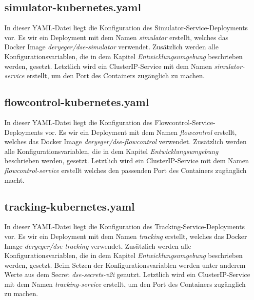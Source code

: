 \subsection{simulator-kubernetes.yaml}

In dieser YAML-Datei liegt die Konfiguration des Simulator-Service-Deploy\-ments vor.
Es wir ein Deployment mit dem Namen \textit{simulator} erstellt, welches das Docker Image \textit{deryeger/dse-simulator} verwendet.
Zusätzlich werden alle Konfigurationsvariablen, die in dem Kapitel \textit{Entwicklungsumgebung} beschrieben werden, gesetzt. 
Letztlich wird ein ClusterIP-Service mit dem Namen \textit{simulator-service} erstellt, um den Port des Containers zugänglich zu machen.

\subsection{flowcontrol-kubernetes.yaml}

In dieser YAML-Datei liegt die Konfiguration des Flowcontrol-Service-Deploy\-ments vor.
Es wir ein Deployment mit dem Namen \textit{flowcontrol} erstellt, welches das Docker Image \textit{deryeger/dse-flowcontrol} verwendet.
Zusätzlich werden alle Konfigurationsvariablen, die in dem Kapitel \textit{Entwicklungsumgebung} beschrieben werden, gesetzt. 
Letztlich wird ein ClusterIP-Service mit dem Namen \textit{flowcontrol-service} erstellt welches den passenden Port des Containers zugänglich macht.

\subsection{tracking-kubernetes.yaml}

In dieser YAML-Datei liegt die Konfiguration des Tracking-Service-Deploy\-ments vor.
Es wir ein Deployment mit dem Namen \textit{tracking} erstellt, welches das Docker Image \textit{deryeger/dse-tracking} verwendet.
Zusätzlich werden alle Konfigurationsvariablen, die in dem Kapitel \textit{Entwicklungsumgebung} beschrieben werden, gesetzt. 
Beim Setzen der Konfigurationsvariablen werden unter anderem Werte aus dem Secret \textit{dse-secrets-v2i} genutzt.
Letztlich wird ein ClusterIP-Service mit dem Namen \textit{tracking-service} erstellt, um den Port des Containers zugänglich zu machen.
